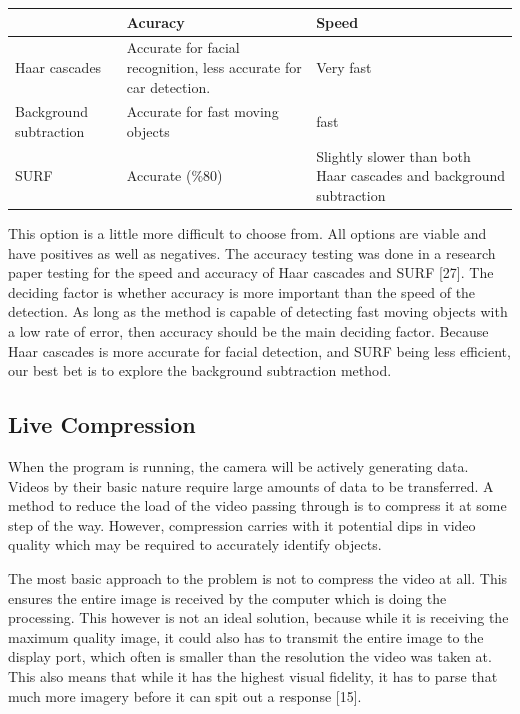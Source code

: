 \documentclass[onecolumn, draftclsnofoot,10pt, compsoc]{IEEEtran}
\begin{document}
\begin{center}
	\begin{tabular}{|p{4cm}|p{5cm}|p{4cm}|}
		
		\hline
		\textbf{} & \textbf{Acuracy} & \textbf{Speed} \\
		\hline
		Haar cascades & Accurate for facial recognition, less accurate for car detection. & Very fast \\
		\hline
		Background subtraction & Accurate for fast moving objects & fast \\
		\hline
		SURF & Accurate (\%80)  & Slightly slower than both Haar cascades and background subtraction \\
		\hline
		
	\end{tabular}
\end{center}

This option is a little more difficult to choose from.
All options are viable and have positives as well as negatives.
The accuracy testing was done in a research paper testing for the speed and accuracy of Haar cascades and SURF [27].
The deciding factor is whether accuracy is more important than the speed of the detection.
As long as the method is capable of detecting fast moving objects with a low rate of error, then accuracy should be the main deciding factor.
Because Haar cascades is more accurate for facial detection, and SURF being less efficient, our best bet is to explore the background subtraction method.

\newpage
\subsection{Live Compression} %

When the program is running, the camera will be actively generating data.  Videos by their basic nature require large amounts of data to be transferred.  A method to reduce the load of the video passing through is to compress it at some step of the way.  However, compression carries with it potential dips in video quality which may be required to accurately identify objects.

The most basic approach to the problem is not to compress the video at all.  This ensures the entire image is received by the computer which is doing the processing.  This however is not an ideal solution, because while it is receiving the maximum quality image, it could also has to transmit the entire image to the display port, which often is smaller than the resolution the video was taken at.  This also means that while it has the highest visual fidelity, it has to parse that much more imagery before it can spit out a response [15].
\end{document}

